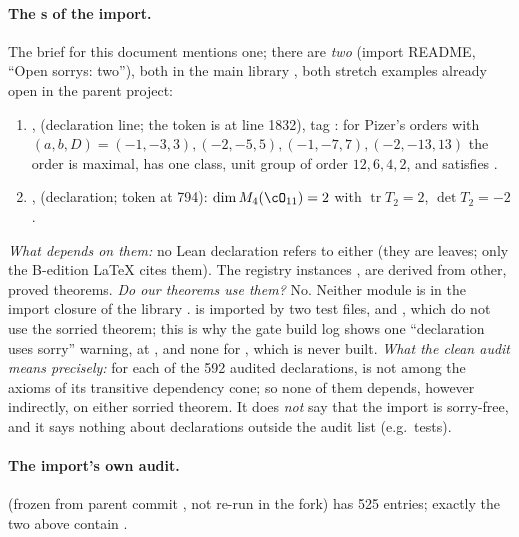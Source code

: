 \paragraph{The s of the import.} The brief for this document mentions one; there are \emph{two}
(import README, ``Open sorrys: two''), both in the main library , both stretch examples already open in
the parent project:
\begin{enumerate}[leftmargin=1.5em]
\item {},  (declaration line;
  the  token is at line 1832), tag : for Pizer's orders with
  $(a,b,D)=(-1,-3,3),(-2,-5,5),(-1,-7,7),(-2,-13,13)$ the order is maximal, has one class, unit group of order
  $12,6,4,2$, and satisfies .
\item {},  (declaration; token
  at 794): $\dim M_4(\cO_{11})=2$ with $\operatorname{tr}T_2=2$, $\det T_2=-2$.
\end{enumerate}
\emph{What depends on them:} no Lean declaration refers to either (they are leaves; only the B-edition LaTeX cites them).
The registry instances ,  are derived from other, proved theorems.
\emph{Do our theorems use them?} No. Neither module is in the import closure of the library .
 is imported by two test files,
 and , which do not use the sorried theorem;
this is why the gate build log shows one ``declaration uses sorry'' warning, at , and none for
, which is never built. \emph{What the clean audit means precisely:} for each of the 592
audited declarations,  is not among the axioms of its transitive dependency cone; so none of them depends,
however indirectly, on either sorried theorem. It does \emph{not} say that the import is sorry-free, and it says nothing
about declarations outside the audit list (e.g.\ tests).

\par\endgroup
\paragraph{The import's own audit.}  (frozen from parent commit
, not re-run in the fork) has 525 entries; exactly the two above contain .

